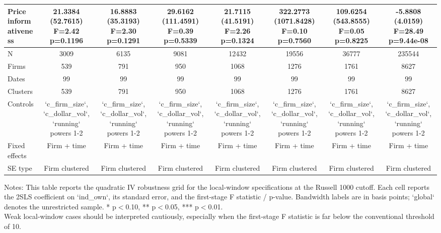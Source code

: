 \begin{table}[!htbp]
\begin{threeparttable}
\begin{tabular}{lccccccc}
Price informativeness & \shortstack{21.3384\\(52.7615)\\F=2.42\\p=0.1196} & \shortstack{16.8883\\(35.3193)\\F=2.30\\p=0.1291} & \shortstack{29.6162\\(111.4591)\\F=0.39\\p=0.5339} & \shortstack{21.7115\\(41.5191)\\F=2.26\\p=0.1324} & \shortstack{322.2773\\(1071.8428)\\F=0.10\\p=0.7560} & \shortstack{109.6254\\(543.8555)\\F=0.05\\p=0.8225} & \shortstack{-5.8808\\(4.0159)\\F=28.49\\p=9.44e-08} \\
\midrule
N & 3009 & 6135 & 9081 & 12432 & 19556 & 36777 & 235544 \\
Firms & 539 & 791 & 950 & 1068 & 1276 & 1761 & 8627 \\
Dates & 99 & 99 & 99 & 99 & 99 & 99 & 99 \\
Clusters & 539 & 791 & 950 & 1068 & 1276 & 1761 & 8627 \\
Controls & `c_firm_size`, `c_dollar_vol`, `running` powers 1-2 & `c_firm_size`, `c_dollar_vol`, `running` powers 1-2 & `c_firm_size`, `c_dollar_vol`, `running` powers 1-2 & `c_firm_size`, `c_dollar_vol`, `running` powers 1-2 & `c_firm_size`, `c_dollar_vol`, `running` powers 1-2 & `c_firm_size`, `c_dollar_vol`, `running` powers 1-2 & `c_firm_size`, `c_dollar_vol`, `running` powers 1-2 \\
Fixed effects & Firm + time & Firm + time & Firm + time & Firm + time & Firm + time & Firm + time & Firm + time \\
SE type & Firm clustered & Firm clustered & Firm clustered & Firm clustered & Firm clustered & Firm clustered & Firm clustered \\
\bottomrule
\end{tabular}
\vspace{0.35em}
\noindent\parbox{\textwidth}{\footnotesize
Notes: This table reports the quadratic IV robustness grid for the local-window specifications at the Russell 1000 cutoff. Each cell reports the 2SLS coefficient on `ind_own`, its standard error, and the first-stage F statistic / p-value. Bandwidth labels are in basis points; `global` denotes the unrestricted sample. * p$<$0.10, ** p$<$0.05, *** p$<$0.01.\\
Weak local-window cases should be interpreted cautiously, especially when the first-stage F statistic is far below the conventional threshold of 10.
}
\end{threeparttable}
\end{table}

